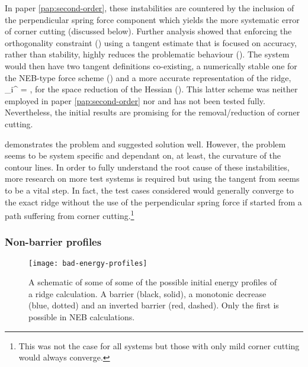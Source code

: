 In paper \ref{pap:second-order}, these instabilities are countered by the inclusion of the perpendicular spring force component which yields the more systematic error of corner cutting (discussed below).
Further analysis showed that enforcing the orthogonality constraint () using a tangent estimate that is focused on accuracy, rather than stability, highly reduces the problematic behaviour ().
The system would then have two tangent definitions co-existing, a numerically stable one for the NEB-type force scheme () and a more accurate representation of the ridge,
\uvt_i^ = ,
\eeq
for the space reduction of the Hessian ().
This latter scheme was neither employed in paper \ref{pap:second-order} nor  and has not been tested fully.
Nevertheless, the initial results are promising for the removal/reduction of corner cutting.

 demonstrates the problem and suggested solution well.
However, the problem seems to be system specific and dependant on, at least, the curvature of the contour lines.
In order to fully understand the root cause of these instabilities, more research on more test systems is required but using the tangent from  seems to be a vital step.
In fact, the test cases considered would generally converge to the exact ridge without the use of the perpendicular spring force if started from a path suffering from corner cutting.\footnote{This was not the case for all systems but those with only mild corner cutting would always converge.}

\subsubsection{Non-barrier profiles}
\begin{SCfigure}[10][htb!]
\centering
    \texttt{[image: bad-energy-profiles]}
\caption{A schematic of some of some of the possible initial energy profiles of a ridge calculation.
A barrier (black, solid), a monotonic decrease (blue, dotted) and an inverted barrier (red, dashed).
Only the first is possible in NEB calculations.
}
\label{fig:bad-energy-profiles}
\end{SCfigure}

